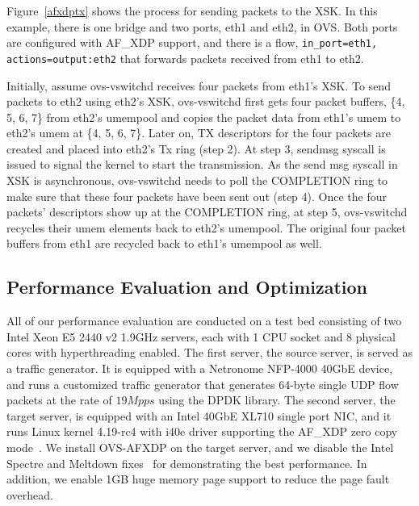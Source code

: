 \documentclass[10pt]{sigplanconf}
\begin{document}
Figure~\ref{afxdptx} shows the process for sending packets to the XSK.
In this example, there is one bridge and two ports, eth1 and eth2, in OVS.
Both ports are configured with AF\_XDP support, and there is a flow,
\texttt{in\_port=eth1, actions=output:eth2} that forwards
packets received from eth1 to eth2.

Initially, assume ovs-vswitchd receives four packets from eth1's XSK.
To send packets to eth2 using eth2's XSK, ovs-vswitchd first gets four packet buffers,
\{4, 5, 6, 7\} from eth2's umempool and copies the packet data from eth1's umem
to eth2's umem at \{4, 5, 6, 7\}.  Later on, TX descriptors for the four packets are
created and placed into eth2's Tx ring (step 2).
At step 3, sendmsg syscall is issued to signal the kernel to start the transmission.
As the send msg syscall in XSK is asynchronous, ovs-vswitchd needs to poll
the COMPLETION ring to make sure that these four packets have been sent out
(step 4).
Once the four packets' descriptors show up at the COMPLETION ring, at step 5,
ovs-vswitchd recycles their umem elements back to eth2's umempool.
The original four packet buffers from eth1 are recycled back to eth1's
umempool as well.

\subsection{Performance Evaluation and Optimization}
All of our performance evaluation are conducted on a test bed consisting of
two Intel Xeon E5 2440 v2 1.9GHz servers, each with 1 CPU socket and
8 physical cores with hyperthreading enabled.
The first server, the source server, is served as a traffic generator.
It is equipped with a Netronome NFP-4000 40GbE device, and runs a customized
traffic generator that generates 64-byte single UDP flow packets
at the rate of $19Mpps$ using the DPDK library.
The second server, the target server, is equipped with an Intel 40GbE XL710
single port NIC, and it runs Linux kernel 4.19-rc4 with i40e driver supporting
the AF\_XDP zero copy mode~\cite{af_xdp_patch_i40e, af_xdp_patch_zc}.
We install OVS-AFXDP on the target server, and
we disable the Intel Spectre and Meltdown fixes~\cite{jesper_xdp_perf_drop, retpoline}
for demonstrating the best performance. In addition, we enable 1GB huge
memory page support to reduce the page fault overhead.
\end{document}
